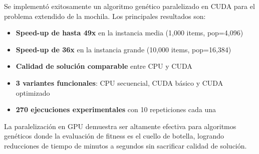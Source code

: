 \documentclass[12pt,a4paper]{article}
\begin{document}
Se implement\'o exitosamente un algoritmo gen\'etico paralelizado en CUDA para el problema extendido de la mochila. Los principales resultados son:

\begin{itemize}
  \item \textbf{Speed-up de hasta 49x} en la instancia media (1,000 items, pop=4,096)
  \item \textbf{Speed-up de 36x} en la instancia grande (10,000 items, pop=16,384)
  \item \textbf{Calidad de soluci\'on comparable} entre CPU y CUDA
  \item \textbf{3 variantes funcionales}: CPU secuencial, CUDA b\'asico y CUDA optimizado
  \item \textbf{270 ejecuciones experimentales} con 10 repeticiones cada una
\end{itemize}

La paralelizaci\'on en GPU demuestra ser altamente efectiva para algoritmos gen\'eticos donde la evaluaci\'on de fitness es el cuello de botella, logrando reducciones de tiempo de minutos a segundos sin sacrificar calidad de soluci\'on.
\end{document}
